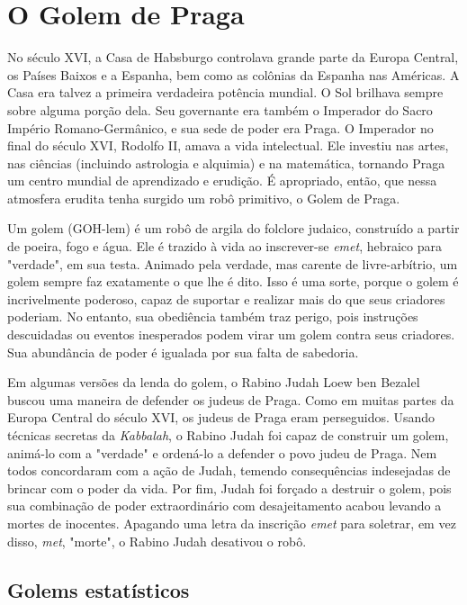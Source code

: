 \section{O Golem de Praga}

No século XVI, a Casa de Habsburgo controlava grande parte da Europa Central, os Países Baixos e a Espanha, bem como as colônias da Espanha nas Américas. A Casa era talvez a primeira verdadeira potência mundial. O Sol brilhava sempre sobre alguma porção dela. Seu governante era também o Imperador do Sacro Império Romano-Germânico, e sua sede de poder era Praga. O Imperador no final do século XVI, Rodolfo II, amava a vida intelectual. Ele investiu nas artes, nas ciências (incluindo astrologia e alquimia) e na matemática, tornando Praga um centro mundial de aprendizado e erudição. É apropriado, então, que nessa atmosfera erudita tenha surgido um robô primitivo, o Golem de Praga.

Um golem (GOH-lem) é um robô de argila do folclore judaico, construído a partir de poeira, fogo e água. Ele é trazido à vida ao inscrever-se \textit{emet}, hebraico para "verdade", em sua testa. Animado pela verdade, mas carente de livre-arbítrio, um golem sempre faz exatamente o que lhe é dito. Isso é uma sorte, porque o golem é incrivelmente poderoso, capaz de suportar e realizar mais do que seus criadores poderiam. No entanto, sua obediência também traz perigo, pois instruções descuidadas ou eventos inesperados podem virar um golem contra seus criadores. Sua abundância de poder é igualada por sua falta de sabedoria.

Em algumas versões da lenda do golem, o Rabino Judah Loew ben Bezalel buscou uma maneira de defender os judeus de Praga. Como em muitas partes da Europa Central do século XVI, os judeus de Praga eram perseguidos. Usando técnicas secretas da \textit{Kabbalah}, o Rabino Judah foi capaz de construir um golem, animá-lo com a "verdade" e ordená-lo a defender o povo judeu de Praga. Nem todos concordaram com a ação de Judah, temendo consequências indesejadas de brincar com o poder da vida. Por fim, Judah foi forçado a destruir o golem, pois sua combinação de poder extraordinário com desajeitamento acabou levando a mortes de inocentes. Apagando uma letra da inscrição \textit{emet} para soletrar, em vez disso, \textit{met}, "morte", o Rabino Judah desativou o robô.

\subsection{Golems estatísticos}

